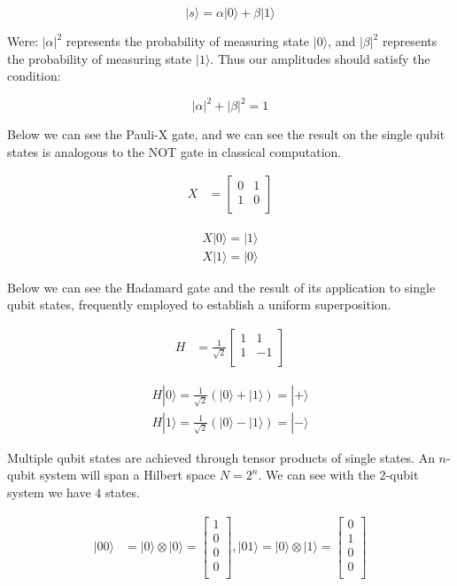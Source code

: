 \documentclass[msc,oneside]{ubcthesis}
\begin{document}
	$$|s\rangle = \alpha|0\rangle + \beta|1\rangle$$
	
	Were: $|\alpha|^2$ represents the probability of measuring state $|0\rangle$,  and $|\beta|^2 $ represents the probability of measuring state $|1\rangle$. Thus our amplitudes should satisfy the condition:
	
	$$|\alpha|^2 + |\beta|^2 = 1$$
	
	Below we can see the Pauli-X gate, and we can see the result on the single qubit states is analogous to the NOT gate in classical computation.
	
		\begin{align*}	
		X &= \begin{bmatrix}
			0 & 1 \\
			1 &0 \\
		\end{bmatrix}
	\end{align*}
	
	\begin{align*}	
		X|0\rangle = |1\rangle\\
		X|1\rangle = |0\rangle
	\end{align*}
	
	
	Below we can see the Hadamard gate and the result of its application to single qubit states, frequently employed to establish a uniform superposition.

	
	\begin{align*}	
		H &=\frac{1}{\sqrt{2}} \begin{bmatrix}
			1 & 1 \\
			1 &-1 \\
		\end{bmatrix}
	\end{align*}
	
	\begin{align*}	
		H|0\rangle = \frac{1}{\sqrt{2}} (|0\rangle + |1\rangle) = |+\rangle\\
		H|1\rangle = \frac{1}{\sqrt{2}} (|0\rangle - |1\rangle) = |-\rangle
	\end{align*}
	
	
	Multiple qubit states are achieved through tensor products of single states. An $n$-qubit system will span a Hilbert space $N = 2^n $. We can see with the $2$-qubit system we have $4$ states. 
	
	\begin{align*}	
		|00\rangle &= |0\rangle \otimes |0\rangle = \begin{bmatrix}
			1 \\
			0 \\
			0 \\
			0 \\
		\end{bmatrix}, 
		|01\rangle = |0\rangle \otimes |1\rangle = \begin{bmatrix}
			0 \\
			1 \\
			0 \\
			0 \\
		\end{bmatrix} 			
	\end{align*}
	
\end{document}
